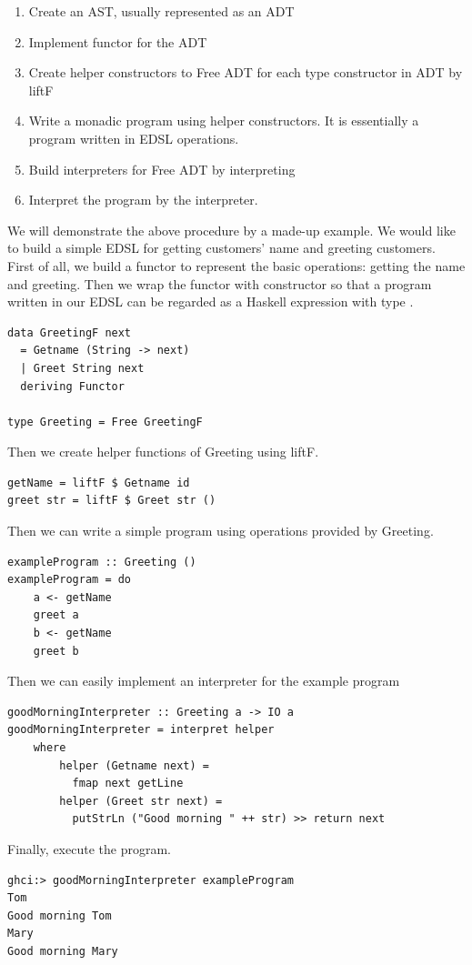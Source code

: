 \begin{enumerate}
  \item Create an AST, usually represented as an ADT
  \item Implement functor for the ADT
  \item Create helper constructors to Free ADT for each type constructor in ADT by liftF 
  \item Write a monadic program using helper constructors. It is essentially a program written in EDSL operations.
  \item Build interpreters for Free ADT by interpreting
  \item Interpret the program by the interpreter.
\end{enumerate}
We will demonstrate the above procedure by a made-up example. We would like to build a simple EDSL for getting customers' name and greeting customers. First of all, we build a functor  to represent the basic operations: getting the name and greeting. Then we wrap the functor with  constructor so that a program written in our EDSL can be regarded as a Haskell expression with type .
\begin{code}
\begin{verbatim}
data GreetingF next
  = Getname (String -> next)
  | Greet String next
  deriving Functor

type Greeting = Free GreetingF
\end{verbatim}
\end{code}
Then we create helper functions of Greeting using liftF.
\begin{verbatim}
getName = liftF $ Getname id
greet str = liftF $ Greet str ()
\end{verbatim}
Then we can write a simple program using operations provided by Greeting.
\begin{verbatim}
exampleProgram :: Greeting ()
exampleProgram = do
    a <- getName
    greet a
    b <- getName
    greet b
\end{verbatim}
Then we can easily implement an interpreter for the example program
\begin{verbatim}
goodMorningInterpreter :: Greeting a -> IO a
goodMorningInterpreter = interpret helper
    where
        helper (Getname next) = 
          fmap next getLine
        helper (Greet str next) =
          putStrLn ("Good morning " ++ str) >> return next  
\end{verbatim} 
Finally, execute the program.
\begin{verbatim}
ghci:> goodMorningInterpreter exampleProgram
Tom
Good morning Tom
Mary
Good morning Mary
\end{verbatim}

